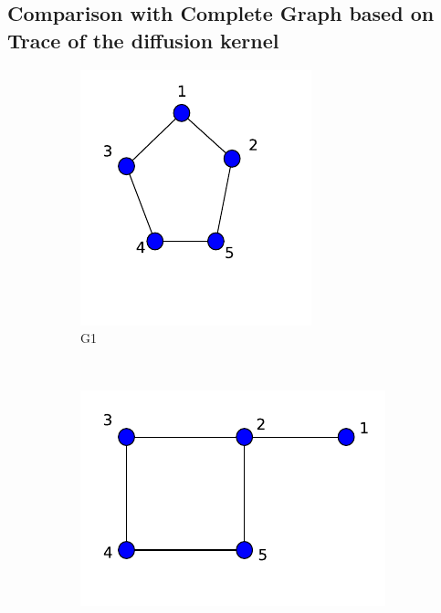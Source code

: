 \documentclass[10pt,a4paper]{article}
\begin{document}
	  \subsection{Comparison with Complete Graph based on Trace of the diffusion kernel}
	  \begin{figure}[H]
	  	\centering
	  	\begin{subfigure}[b]{0.35\textwidth}
	  		\includegraphics[width= \textwidth]{images/cycle-khop.pdf}
	  		\caption{G1}
	  		\label{G1}
	  	\end{subfigure}~
	  	\begin{subfigure}[b]{0.35\textwidth}
	  		\includegraphics[width= \textwidth]{images/kenel-toymodel.pdf}

\end{subfigure}
\end{figure}
\end{document}
